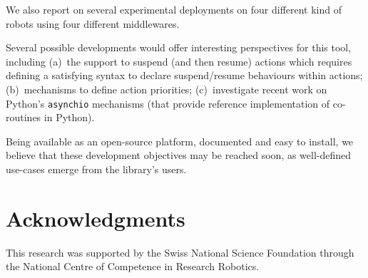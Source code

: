 \documentclass[a4paper, 10pt, conference]{ieeeconf}      %
\begin{document}
We also report on several experimental deployments on four different
kind of robots using four different middlewares.

Several possible developments would offer interesting perspectives for this
tool, including (a)~the support to suspend (and then resume) actions which
requires defining a satisfying syntax to declare suspend/resume behaviours
within actions; (b)~mechanisms to define action priorities; (c)~investigate
recent work on Python's {\tt asynchio} mechanisms (that provide reference
implementation of co-routines in Python).

Being available as an open-source platform, documented and easy to install, we
believe that these development objectives may be reached soon, as well-defined
use-cases emerge from the library's users.

\section*{Acknowledgments}

This research was supported by the Swiss National Science Foundation through the
National Centre of Competence in Research Robotics.




\end{document}
